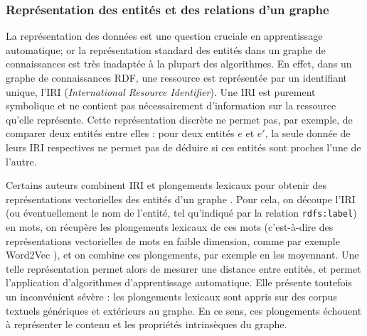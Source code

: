 \subsubsection{Représentation des entités et des relations d'un graphe}
\newcommand{\IRI}{\operatorname{IRI}}
\newcommand{\Adja}{\operatorname{Adj}}

La représentation des données est une question cruciale en apprentissage automatique; or la représentation standard des entités dans un graphe de connaissances est très inadaptée à la plupart des algorithmes. En effet, dans un graphe de connaissances RDF, une ressource est représentée par un identifiant unique, l'IRI (\textit{International Resource Identifier}). 
Une IRI est purement symbolique et ne contient pas nécessairement d'information sur la ressource qu'elle représente. %
Cette représentation discrète ne permet pas, par exemple, de comparer deux entités entre elles : pour deux entités $e$ et $e'$, la seule donnée de leurs IRI respectives ne permet pas de déduire si ces entités sont proches l'une de l'autre. %

Certains auteurs combinent IRI et plongements lexicaux pour obtenir des représentations vectorielles des entités d'un graphe \cite{socher2013reasoning}. Pour cela, on découpe l'IRI (ou éventuellement le nom de l'entité, tel qu'indiqué par la relation \texttt{rdfs:label}) en mots, on récupère les plongements lexicaux de ces mots (c'est-à-dire des représentations vectorielles de mots en faible dimension, comme par exemple Word2Vec \cite{mikolov2013distributed}), et on combine ces plongements, par exemple en les moyennant.
Une telle représentation permet alors de mesurer une distance entre entités, et permet l'application d'algorithmes d'apprentissage automatique. Elle présente toutefois un inconvénient sévère : les plongements lexicaux sont appris sur des corpus textuels génériques et extérieurs au graphe. En ce sens, ces plongements échouent à représenter le contenu et les propriétés intrinsèques du graphe. 


